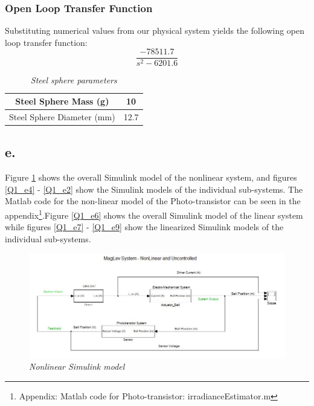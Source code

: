 \documentclass{article}
\theoremstyle{plain}
\theoremstyle{definition}
\theoremstyle{remark}
\begin{document}
\subsubsection*{Open Loop Transfer Function}
Substituting numerical values from our physical system yields the following open loop transfer function:
$$ \frac{-78511.7}{s^2 - 6201.6} $$

\begin{table}[hbt]
\begin{center}
    \begin{tabular}{|c|c|}
        \hline
        Steel Sphere Mass (g)      & 10   \\ \hline
        Steel Sphere Diameter (mm) & 12.7 \\
        \hline
    \end{tabular}
\caption{\emph{Steel sphere parameters}}
\label{Q1_dt5}
\end{center}
\end{table}


\subsection*{e.}
Figure \ref{Q1_e1}  shows the overall Simulink model of the nonlinear system, and figures \ref{Q1_e4} - \ref{Q1_e2} show the Simulink models of the individual sub-systems. The Matlab code for the non-linear model of the Photo-transistor can be seen in the appendix\footnote{Appendix: Matlab code for Photo-transistor: irradianceEstimator.m }.Figure \ref{Q1_e6}  shows the overall Simulink model of the linear system while figures \ref{Q1_e7} - \ref{Q1_e9} show the linearized Simulink models of the individual sub-systems.\\
\begin{figure}
\begin{center}
\includegraphics[width = 15cm]{NonLinearUnControlledComplete}
\caption{\emph{Nonlinear Simulink model}}
\label{Q1_e1}
\end{center}
\end{figure}
\end{document}
